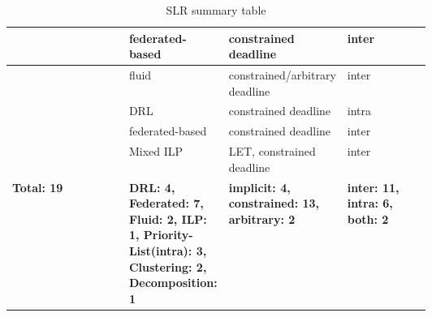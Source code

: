 \begin{table}
\begin{tabular}[]{|l|p{0.20\linewidth}|p{0.20\linewidth}|p{0.20\linewidth}|}
        \hline
        \cite{Jiang2023SchedVirtualProcs} & federated-based & constrained deadline & inter\\
        \hline
        \cite{GuanFluidDag2022} & fluid & constrained/arbitrary deadline & inter\\
        \hline
        \cite{GuanFRTDS2020RL} & DRL & constrained deadline & intra \\
        \hline
        \cite{JiangVirtuallyFederatedSched2021} & federated-based & constrained deadline & inter\\
        \hline
        \cite{Pazzaglia2021DMALETtransfer} & Mixed ILP & LET, constrained deadline & inter\\
        \hline
        \textbf{Total: 19} & \textbf{DRL: 4, Federated: 7, Fluid: 2, ILP: 1, Priority-List(intra): 3, Clustering: 2, Decomposition: 1}
        & \textbf{implicit: 4, constrained: 13, arbitrary: 2} & \textbf{inter: 11, intra: 6, both: 2} \\
        \hline
    \end{tabular}
    \caption{SLR summary table}
    \label{tab:slt_sum_table}
\end{table}



